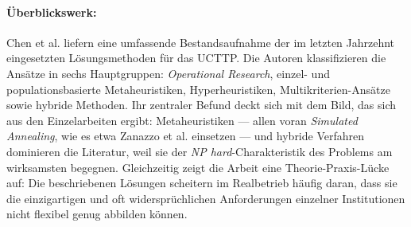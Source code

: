 \paragraph{Überblickswerk:}
Chen et al. \cite{chen-2021} liefern eine umfassende Bestandsaufnahme der im letzten Jahrzehnt eingesetzten Lösungsmethoden für das UCTTP. Die Autoren klassifizieren die Ansätze in sechs Hauptgruppen: \textit{Operational Research}, einzel- und populationsbasierte Metaheuristiken, Hyperheuristiken, Multikriterien-Ansätze sowie hybride Methoden. Ihr zentraler Befund deckt sich mit dem Bild, das sich aus den Einzelarbeiten ergibt: Metaheuristiken --- allen voran \textit{Simulated Annealing}, wie es etwa Zanazzo et al. \cite{v-zanazzo2025solving} einsetzen --- und hybride Verfahren dominieren die Literatur, weil sie der \textit{NP hard}-Charakteristik des Problems am wirksamsten begegnen. Gleichzeitig zeigt die Arbeit eine Theorie-Praxis-Lücke auf: Die beschriebenen Lösungen scheitern im Realbetrieb häufig daran, dass sie die einzigartigen und oft widersprüchlichen Anforderungen einzelner Institutionen nicht flexibel genug abbilden können.


